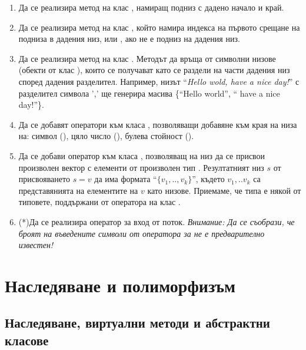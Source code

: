 \begin{enumerate}
  \item Да се реализира метод  на клас , намиращ подниз с дадено начало и край.
  \item Да се реализира метод  на клас , който намира индекса на първото срещане на подниза  в дадения низ, или , ако  не е подниз на дадения низ.
  \item Да се реализира метод  на клас . Методът да връща  от символни низове (обекти от клас ), които се получават като се раздели на части дадения низ според дадения разделител. Например, низът ``\emph{Hello wold, have a nice day!}'' с разделител символа ',' ще генерира масива \{``Hello world'', `` have a nice day!''\}.
  \item Да се добавят оператори \code{+=} към класа , позволяващи добавяне към края на низа на: символ (), цяло число (), булева стойност ().
  \item Да се добави оператор \code{=} към класа , позволяващ на низ да се присвои произволен вектор с елементи от произволен тип . Резултатният низ $s$ от присвояването $s=v$ да има формата ``$\{v_1,..,v_k\}$'', където $v_1,..v_k$ са представянията на елементите на $v$ като низове. Приемаме, че типа  е някой от типовете, поддържани от оператора \code{+=} на клас .
  \item (*)Да се реализира оператор за вход от поток. \emph{Внимание: Да се съобрази, че броят на въведените символи от оператора  \code{>{}>} за  не е предварително известен!}

\end{enumerate}


\clearpage\section {Наследяване и полиморфизъм}

\subsection {Наследяване, виртуални методи и абстрактни класове}

